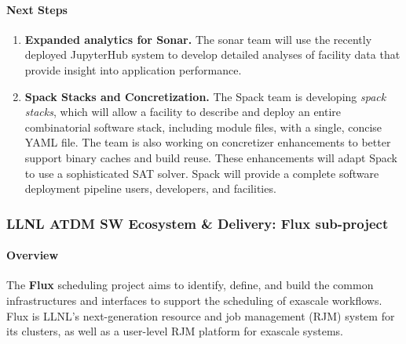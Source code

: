 \paragraph{Next Steps}
\begin{enumerate}

    \item {\bf Expanded analytics for Sonar.} The sonar team will use the
    recently deployed JupyterHub system to develop detailed analyses of
    facility data that provide insight into application performance.

    \item {\bf Spack Stacks and Concretization.} The Spack team is
    developing {\it spack stacks}, which will allow a facility to
    describe and deploy an entire combinatorial software stack, including
    module files, with a single, concise YAML file. The team is also
    working on concretizer enhancements to better support binary caches
    and build reuse. These enhancements will adapt Spack to use a
    sophisticated SAT solver. Spack will provide a complete software
    deployment pipeline users, developers, and facilities.
\end{enumerate}


\subsubsection{ LLNL ATDM SW Ecosystem \& Delivery: Flux sub-project}
\paragraph{Overview}
The {\bf Flux} scheduling project aims to identify, define, and build the
common infrastructures and interfaces to support the scheduling of
exascale workflows. Flux is LLNL's next-generation resource and job
management (RJM) system for its clusters, as well as a user-level RJM
platform for exascale systems.


